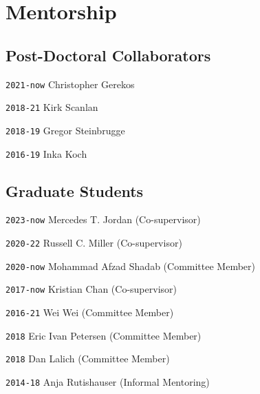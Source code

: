 \section*{Mentorship}

\TabPositions{6em,20em,28em}

\subsection*{Post-Doctoral Collaborators}

\noindent \texttt{2021-now} \tab Christopher Gerekos 

\noindent \texttt{2018-21} \tab Kirk Scanlan 

\noindent \texttt{2018-19} \tab Gregor Steinbrugge

\noindent \texttt{2016-19} \tab Inka Koch

\vspace{-1em}
\subsection*{Graduate Students}

\noindent \texttt{2023-now} \tab Mercedes T. Jordan \tab [MS] \tab (Co-supervisor)

\noindent \texttt{2020-22} \tab Russell C. Miller \tab [MS] \tab (Co-supervisor)

\noindent \texttt{2020-now} \tab Mohammad Afzad Shadab \tab [PhD] \tab (Committee Member)

\noindent \texttt{2017-now} \tab Kristian Chan \tab [PhD] \tab (Co-supervisor)

\noindent \texttt{2016-21} \tab Wei Wei \tab [PhD] \tab (Committee Member)

\noindent \texttt{2018} \tab Eric Ivan Petersen  \tab [PhD] \tab (Committee Member)

\noindent \texttt{2018} \tab Dan Lalich \tab [PhD] \tab (Committee Member)

\noindent \texttt{2014-18} \tab Anja Rutishauser  \tab (Informal Mentoring)

